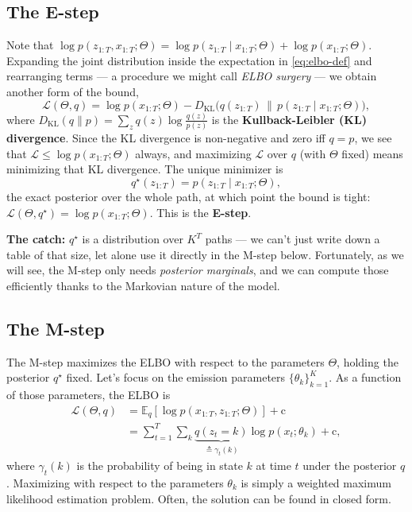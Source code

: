 \documentclass[11pt]{article}
\newcommand{\KL}{D_{\mathrm{KL}}}
\newcommand{\E}{\mathbb{E}}
\begin{document}
\subsection{The E-step}

Note that $\log p(z_{1:T}, x_{1:T}; \Theta) = \log p(z_{1:T} \mid x_{1:T}; \Theta) + \log p(x_{1:T}; \Theta)$. Expanding the joint distribution inside the
expectation in \eqref{eq:elbo-def} and rearranging terms --- a procedure we might call \textit{ELBO surgery} --- we obtain another form of the bound,
\begin{equation}
\mathcal{L}(\Theta, q) = \log p(x_{1:T}; \Theta)
- \KL\bigl(q(z_{1:T}) \,\|\, p(z_{1:T} \mid x_{1:T}; \Theta)\bigr),
\label{eq:elbo-kl}
\end{equation}
where $\KL(q\|p) = \sum_z q(z)\log\frac{q(z)}{p(z)}$ is the \textbf{Kullback-Leibler (KL) divergence}. Since the KL divergence is non-negative and zero iff $q=p$,
we see that $\mathcal{L} \leq \log p(x_{1:T};\Theta)$ always, and
maximizing $\mathcal L$ over $q$ (with $\Theta$ fixed) means minimizing that
KL divergence. The unique minimizer is
\begin{equation}
\boxed{q^\star(z_{1:T}) = p(z_{1:T} \mid x_{1:T}; \Theta),}
\label{eq:e-step}
\end{equation}
the exact posterior over the whole path, at which point the bound is tight:
$\mathcal L(\Theta, q^\star) = \log p(x_{1:T};\Theta)$. This is the
\textbf{E-step}.

\textbf{The catch:} $q^\star$ is a distribution over $K^T$ paths --- we
can't just write down a table of that size, let alone use it directly in
the M-step below. Fortunately, as we will see, the M-step only needs \textit{posterior marginals}, and we can compute those efficiently thanks to the Markovian nature of the model.

\subsection{The M-step}

The M-step maximizes the ELBO with respect to the parameters $\Theta$, holding the posterior $q^\star$ fixed. Let's focus on the emission parameters $\{\theta_k\}_{k=1}^K$. As
a function of those parameters, the ELBO is
\begin{align}
  \mathcal{L}(\Theta, q)
  &= \E_q\left[ \log p(x_{1:T}, z_{1:T}; \Theta)\right] + \mathrm{c} \\
  &= \sum_{t=1}^T \sum_k \underbrace{q(z_t = k)}_{\triangleq \gamma_t(k)} \log p(x_t ; \theta_k) + \mathrm{c},
\end{align}
where $\gamma_t(k)$ is the probability of being in state $k$ at time $t$ under the posterior $q$.
Maximizing with respect to the parameters $\theta_k$ is simply a weighted maximum likelihood estimation problem. Often, the solution can be found in closed form.
\end{document}
